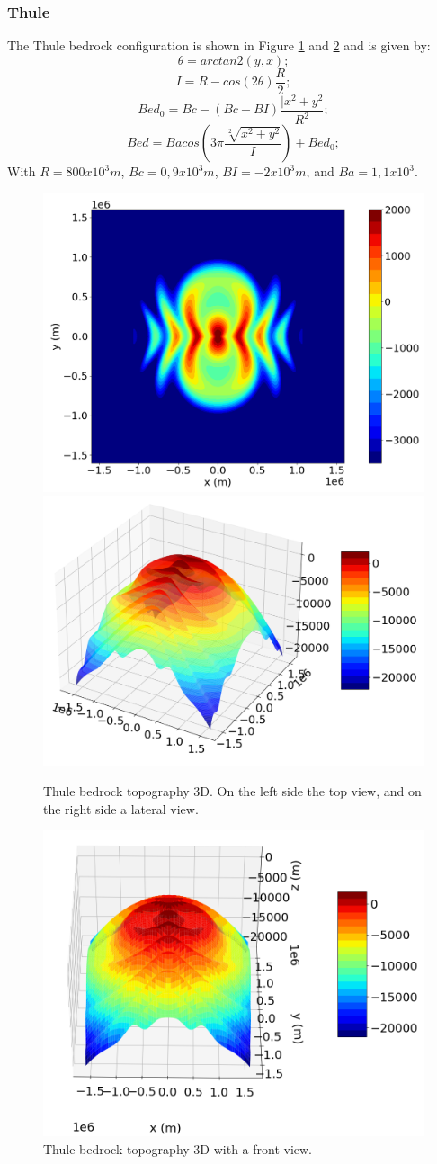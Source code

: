 \documentclass{article}
\begin{document}
\subsubsection{Thule}
The Thule bedrock configuration is shown in Figure \ref{Thule_3D} and \ref{Thule_3D1} and is given by:
\begin{equation}
	\theta=arctan2(y,x);
\end{equation}
\begin{equation}
	I=R-cos(2\theta)\frac{R}{2};
\end{equation}
\begin{equation}
	Bed_0=Bc-(Bc-BI)\frac{|x^2+y^2}{R^2};
\end{equation}
\begin{equation}
	Bed=Bacos(3\pi\frac{\sqrt[2]{x^2+y^2}}{I})+Bed_0;
\end{equation}
With $R=800 x 10^3 m$, $Bc=0,9 x 10^3 m$, $BI=-2 x 10^3 m$, and $Ba=1,1 x 10^3$.
\begin{figure}[!h]
	\centering
	\includegraphics[width=0.45\linewidth]{../fig/Thule_2D}
	\includegraphics[width=0.45\linewidth]{../fig/Thule_3D}
	\caption{Thule bedrock topography 3D. On the left side the top view, and on the right side a lateral view.}
	\label{Thule_3D}
\end{figure}
\begin{figure}[!h]
	\centering
	\includegraphics[width=0.45\linewidth]{../fig/Thule_3D1}
	\caption{Thule bedrock topography 3D with a front view.}
	\label{Thule_3D1}
\end{figure}
\end{document}
